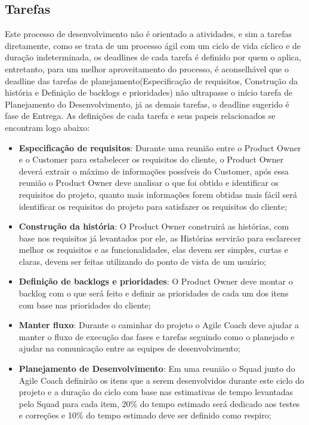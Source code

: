 \documentclass[	DIV=calc,%
							paper=a4,%
							fontsize=12pt,%
							onecolumn]{scrartcl}	 					%
\begin{document}
\subsection{Tarefas}
Este processo de desenvolvimento não é orientado a atividades, e sim a tarefas diretamente, como se trata de um processo ágil com um ciclo de vida cíclico e de duração indeterminada, os deadlines de cada tarefa é definido por quem o aplica, entretanto, para um melhor aproveitamento do processo, é aconselhável que o deadline das tarefas de planejamento(Especificação de requisitos, Construção da história e Definição de backlogs e prioridades) não ultrapasse  o início tarefa de Planejamento do Desenvolvimento, já as demais tarefas, o deadline sugerido é fase de Entrega. 
As definições de cada tarefa e seus papeis relacionados se encontram logo abaixo: 
\begin{itemize}
	\item \textbf{Especificação de requisitos}: Durante uma reunião entre o Product Owner e o Customer para estabelecer os requisitos do cliente, o Product Owner deverá extrair o máximo de informações possíveis do Customer, após essa reunião o Product Owner deve analisar o que foi obtido e identificar os requisitos do projeto, quanto mais informações forem obtidas mais fácil será identificar os requisitos do projeto para satisfazer os requisitos do cliente;  
	
	\item \textbf{Construção da história}: O Product Owner construirá as histórias, com base nos requisitos já levantados por ele, as Histórias servirão para esclarecer melhor os requisitos e as funcionalidades, elas devem ser simples, curtas e claras, devem ser feitas utilizando do ponto de vista de um usuário;
	
	\item \textbf{Definição de backlogs e prioridades}: O Product Owner deve montar o backlog com o que será feito e definir as prioridades de cada um dos itens com base nas prioridades do cliente; 
	
	\item \textbf{Manter fluxo}: Durante o caminhar do projeto o Agile Coach deve ajudar a manter o fluxo de execução das fases e tarefas seguindo como o planejado e ajudar na comunicação entre as equipes de desenvolvimento; 
	
	\item \textbf{Planejamento de Desenvolvimento}:  Em uma reunião o Squad junto do Agile Coach definirão os itens que a serem desenvolvidos durante este ciclo do projeto e a duração do ciclo com base nas estimativas de tempo levantadas pelo Squad para cada item, 20\% do tempo estimado será dedicado aos testes e correções e 10\% do tempo estimado deve ser definido como respiro; 
	

\end{itemize}
\end{document}
